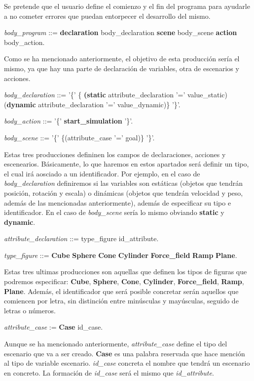 \documentclass[12pt]{article}
\begin{document}
Se pretende que el usuario define el comienzo y el fin del programa para ayudarle a no cometer errores que puedan entorpecer el desarrollo del mismo.

\noindent \textit{body\_program} ::= \textbf{declaration} body\_declaration \textbf{scene} body\_scene \textbf{action} body\_action.

Como se ha mencionado anteriormente, el objetivo de esta producción sería el mismo, ya que hay una parte de declaración de variables, otra de escenarios y acciones.

\noindent\textit{body\_declaration} ::= '\{' \{ \textbf{(static} attribute\_declaration '=' value\_static) \textbar (\textbf{dynamic} attribute\_declaration '=' value\_dynamic)\}  '\}'.

\noindent \textit{body\_action} ::= '\{' \textbf{start\_simulation} '\}'.

\noindent \textit{body\_scene} ::= '\{' \{(attribute\_case '=' goal)\} '\}'.

Estas tres producciones defininen los campos de declaraciones, acciones y escenearios. Básicamente, lo que haremos en estos apartados será definir un tipo, el cual irá aosciado a un identificador. Por ejemplo, en el caso de \textit{body\_declaration} definiremos si las variables son estáticas (objetos que tendrán posición, rotación y escala) o dinámicas (objetos que tendrán velocidad y peso, además de las mencionadas anteriormente), además de especificar su tipo e identificador. En el caso de \textit{body\_scene} sería lo mismo obviando \textbf{static} y \textbf{dynamic}.

\noindent \textit{attribute\_declaration} ::= type\_figure id\_attribute.

\noindent \textit{type\_figure} ::= \textbf{Cube} \textbar \textbf{Sphere} \textbar \textbf{Cone} \textbar \textbf{Cylinder} \textbar \textbf{Force\_field} \textbar \textbf{Ramp} \textbar  \textbf{Plane}.

Estas tres ultimas producciones son aquellas que definen los tipos de figuras que podremos especificar: \textbf{Cube}, \textbf{Sphere}, \textbf{Cone}, \textbf{Cylinder}, \textbf{Force\_field}, \textbf{Ramp}, \textbf{Plane}. Además, el identificador que será posible concretar serán aquellos que comiencen por letra, sin distinción entre minúsculas y mayúsculas, seguido de letras o números.

\noindent \textit{attribute\_case} := \textbf{Case} id\_case.

Aunque se ha mencionado anteriormente, \textit{attribute\_case} define el tipo del escenario que va a ser creado.  \textbf{Case} es una palabra reservada que hace mención al tipo de variable escenario. \textit{id\_case} concreta el nombre que tendrá un escenario en concreto. La formación de \textit{id\_case} será el mismo que \textit{id\_attribute}.
\end{document}
